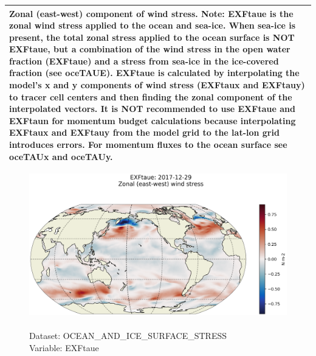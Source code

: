 \begin{longtable}{|p{}|p{}|p{}|p{}|}
\multicolumn{4}{|p{1\textwidth}|}{Zonal (east-west) component of wind stress. Note: EXFtaue is the zonal wind stress applied to the ocean and sea-ice. When sea-ice is present, the total zonal stress applied to the ocean surface is NOT EXFtaue, but a combination of the wind stress in the open water fraction (EXFtaue) and a stress from sea-ice in the ice-covered fraction (see oceTAUE). EXFtaue is calculated by interpolating the model's x and y components of wind stress (EXFtaux and EXFtauy) to tracer cell centers and then finding the zonal component of the interpolated vectors. It is NOT recommended to use EXFtaue and EXFtaun for momentum budget calculations because interpolating EXFtaux and EXFtauy from the model grid to the lat-lon grid introduces errors. For momentum fluxes to the ocean surface see oceTAUx and oceTAUy.} \\ \hline
\end{longtable}

\begin{figure}[H]
\centering
\includegraphics[scale=0.5]{../images/plots/latlon_plots/Ocean_and_Sea-Ice_Surface_Stress/EXFtaue.png}
\caption{\\Dataset: OCEAN\_AND\_ICE\_SURFACE\_STRESS\\Variable: EXFtaue}
\label{tab:table-OCEAN_AND_ICE_SURFACE_STRESS_EXFtaue-Plot}
\end{figure}
\pagebreak
